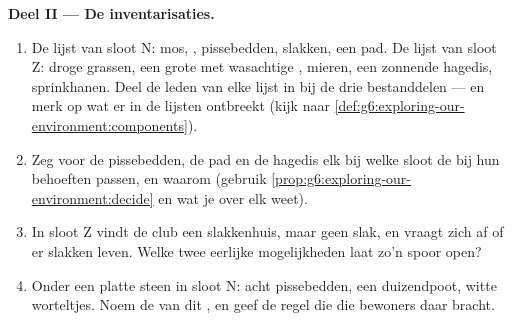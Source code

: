 \begin{problem}
\medskip\noindent\textbf{Deel II --- De inventarisaties.}
\begin{enumerate}[resume]
  \item De lijst van sloot N: mos, , pissebedden, slakken, een pad.
        De lijst van sloot Z: droge grassen, een grote  met
        wasachtige , mieren, een zonnende hagedis, sprinkhanen.
        Deel de leden van elke lijst in bij de drie  bestanddelen
        --- en merk op wat er in de lijsten ontbreekt (kijk naar
        \cref{def:g6:exploring-our-environment:components}).
  \item Zeg voor de pissebedden, de pad en de hagedis elk bij welke sloot
        de  bij hun behoeften passen, en waarom (gebruik
        \cref{prop:g6:exploring-our-environment:decide} en wat je over
        elk  weet).
  \item In sloot Z vindt de club een slakkenhuis, maar geen slak, en
        vraagt zich af of er slakken leven. Welke twee eerlijke
        mogelijkheden laat zo'n spoor open?
  \item Onder een platte steen in sloot N: acht pissebedden, een
        duizendpoot, witte worteltjes. Noem de  van dit
        , en geef de regel die die bewoners daar bracht.
\end{enumerate}


\end{problem}
